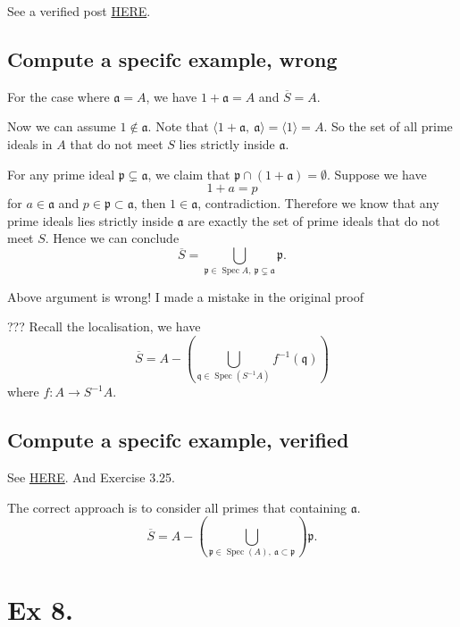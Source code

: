 See a verified post \href{http://www.math.caltech.edu/~2016-17/1term/ma120a/solutions/Sol1.pdf}{HERE}. 

\subsection{Compute a specifc example, wrong}

For the case where $\mathfrak a=A$, we have $1+\mathfrak a=A$ and $\overline{S}=A$.

Now we can assume $1\notin \mathfrak a$.
Note that $\langle 1+\mathfrak a,~ \mathfrak a\rangle=\langle 1\rangle=A$. So the set of all prime ideals in $A$ that do not meet $S$ lies strictly inside $\mathfrak a$. 

For any prime ideal $\mathfrak p\subsetneq \mathfrak a$, we claim that $\mathfrak p\cap (1+\mathfrak a)=\emptyset$. Suppose we have 
$$1+a=p$$ for $a\in\mathfrak a$ and $p\in\mathfrak p\subset\mathfrak a$, then $1\in \mathfrak a$, contradiction. 
Therefore we know that any prime ideals lies strictly inside $\mathfrak a$ are exactly the set of prime ideals that do not meet $S$. Hence we can conclude 
$$\overline{S}=\bigcup_{\mathfrak p\in\operatorname{Spec}A,~\mathfrak p\subsetneq \mathfrak a}\mathfrak p.$$

Above argument is wrong! I made a mistake in the original proof 

??? Recall the localisation, we have 
$$\overline{S}=A-\left(\bigcup_{\mathfrak q\in\operatorname{Spec}(S^{-1}A)}f^{-1}(\mathfrak q)\right)$$ where $f:A\to S^{-1}A$.

\subsection{Compute a specifc example, verified}

See \href{https://math.stackexchange.com/questions/1635191/saturation-of-a-multiplicatively-closed-subset}{HERE}. And \cite{altman} Exercise 3.25. 

The correct approach is to consider all primes that containing $\mathfrak a$.
$$\overline{S}=A-\left(\bigcup_{\mathfrak p\in\operatorname{Spec}(A),~ \mathfrak a\subset\mathfrak p}\right)\mathfrak p.$$

\section{Ex 8.}

\subsection{}

